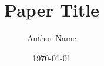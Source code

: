 \title{Paper Title}
\author{Author Name}
\date{\today}

\newcommand{\PaperAbstract}{%
Replace this text with a concise statement of the problem, method, principal
result, and contribution.}

\newif\ifshowglossary
\showglossarytrue
\newif\ifshowbibliography
\showbibliographytrue
